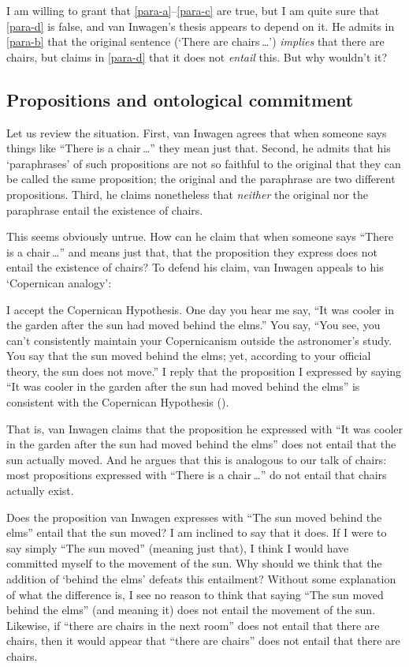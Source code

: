 \documentclass[11pt]{article}
\newenvironment{squote}{%
\begin{spacing}{1}
\begin{list}{}{%
    \setlength{\labelwidth}{0pt}%
    \rightmargin\leftmargin%
  }
\item\relax
}{%
\end{list}%
\end{spacing}
}
\begin{document}
\begin{spacing}{1.5}
I am willing to grant that \ref{para-a}--\ref{para-c} are true, but I
am quite sure that \ref{para-d} is false, and van Inwagen's thesis
appears to depend on it.  He admits in \ref{para-b} that the original
sentence (`There are chairs\,\ldots ') {\em implies} that there are
chairs, but claims in \ref{para-d} that it does not {\em entail} this.
But why wouldn't it?

\subsection{Propositions and ontological commitment}
\label{prop-ont}
Let us review the situation.  First, van Inwagen agrees that when
someone says things like ``There is a chair\,\ldots '' they mean just
that.  Second, he admits that his `paraphrases' of such propositions
are not so faithful to the original that they can be called the same
proposition; the original and the paraphrase are two different
propositions.  Third, he claims nonetheless that {\em neither} the
original nor the paraphrase entail the existence of chairs.

This seems obviously untrue.  How can he claim that when someone says
``There is a chair\,\ldots '' and means just that, that the
proposition they express does not entail the existence of chairs?  To
defend his claim, van Inwagen appeals to his `Copernican analogy':

\begin{squote}
I accept the Copernican Hypothesis.  One day you hear me say, ``It was
cooler in the garden after the sun had moved behind the elms.''  You
say, ``You see, you can't consistently maintain your Copernicanism
outside the astronomer's study.  You say that the sun moved behind the
elms; yet, according to your official theory, the sun does not move.''
I reply that the proposition I expressed by saying ``It was cooler in
the garden after the sun had moved behind the elms'' is consistent
with the Copernican Hypothesis (\citeyear[101]{inwagen1995}).
\end{squote}
That is, van Inwagen claims that the proposition he expressed with
``It was cooler in the garden after the sun had moved behind the
elms'' does not entail that the sun actually moved.  And he argues
that this is analogous to our talk of chairs: most propositions
expressed with ``There is a chair\,\ldots '' do not entail that chairs
actually exist.

Does the proposition van Inwagen expresses with ``The sun moved behind
the elms'' entail that the sun moved? I am inclined to say that it
does.  If I were to say simply ``The sun moved'' (meaning just that),
I think I would have committed myself to the movement of the sun.  Why
should we think that the addition of `behind the elms' defeats this
entailment?  Without some explanation of what the difference is, I see
no reason to think that saying ``The sun moved behind the elms'' (and
meaning it) does not entail the movement of the sun.  Likewise, if
``there are chairs in the next room'' does not entail that there are
chairs, then it would appear that ``there are chairs'' does not entail
that there are chairs.


\end{spacing}
\end{document}
